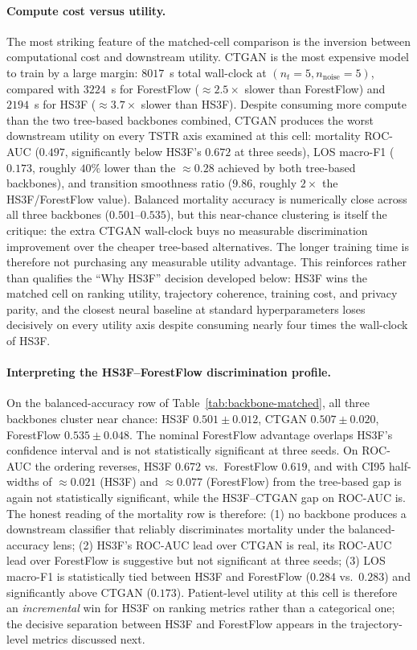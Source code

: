 \paragraph{Compute cost versus utility.}
The most striking feature of the matched-cell comparison is the inversion between computational cost and downstream utility. CTGAN is the most expensive model to train by a large margin: $8017$~s total wall-clock at $(n_t{=}5, n_{\text{noise}}{=}5)$, compared with $3224$~s for ForestFlow ($\approx 2.5\times$ slower than ForestFlow) and $2194$~s for HS3F ($\approx 3.7\times$ slower than HS3F). Despite consuming more compute than the two tree-based backbones combined, CTGAN produces the worst downstream utility on every TSTR axis examined at this cell: mortality ROC-AUC ($0.497$, significantly below HS3F's $0.672$ at three seeds), LOS macro-F1 ($0.173$, roughly $40\%$ lower than the $\approx 0.28$ achieved by both tree-based backbones), and transition smoothness ratio ($9.86$, roughly $2\times$ the HS3F/ForestFlow value). Balanced mortality accuracy is numerically close across all three backbones ($0.501$--$0.535$), but this near-chance clustering is itself the critique: the extra CTGAN wall-clock buys no measurable discrimination improvement over the cheaper tree-based alternatives. The longer training time is therefore not purchasing any measurable utility advantage. This reinforces rather than qualifies the ``Why HS3F'' decision developed below: HS3F wins the matched cell on ranking utility, trajectory coherence, training cost, and privacy parity, and the closest neural baseline at standard hyperparameters loses decisively on every utility axis despite consuming nearly four times the wall-clock of HS3F.

\paragraph{Interpreting the HS3F--ForestFlow discrimination profile.}
On the balanced-accuracy row of Table~\ref{tab:backbone-matched}, all three backbones cluster near chance: HS3F $0.501 \pm 0.012$, CTGAN $0.507 \pm 0.020$, ForestFlow $0.535 \pm 0.048$. The nominal ForestFlow advantage overlaps HS3F's confidence interval and is not statistically significant at three seeds. On ROC-AUC the ordering reverses, HS3F $0.672$ vs.\ ForestFlow $0.619$, and with CI95 half-widths of $\approx 0.021$ (HS3F) and $\approx 0.077$ (ForestFlow) from  the tree-based gap is again not statistically significant, while the HS3F--CTGAN gap on ROC-AUC is. The honest reading of the mortality row is therefore: (1) no backbone produces a downstream classifier that reliably discriminates mortality under the balanced-accuracy lens; (2) HS3F's ROC-AUC lead over CTGAN is real, its ROC-AUC lead over ForestFlow is suggestive but not significant at three seeds; (3) LOS macro-F1 is statistically tied between HS3F and ForestFlow ($0.284$ vs.\ $0.283$) and significantly above CTGAN ($0.173$). Patient-level utility at this cell is therefore an \emph{incremental} win for HS3F on ranking metrics rather than a categorical one; the decisive separation between HS3F and ForestFlow appears in the trajectory-level metrics discussed next.

